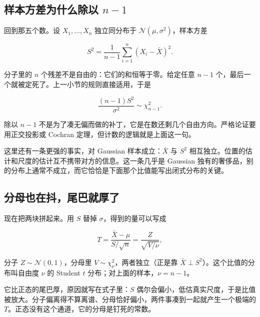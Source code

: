 \subsection{样本方差为什么除以 \texorpdfstring{\(n-1\)}{n-1}}

回到那五个数。设 \(X_1,\ldots,X_n\) 独立同分布于 \(\mathcal N(\mu,\sigma^2)\)，样本方差

\[
S^2=\frac1{n-1}\sum_{i=1}^n(X_i-\bar X)^2 .
\]

分子里的 \(n\) 个残差不是自由的：它们的和恒等于零。给定任意 \(n-1\) 个，最后一个就被定死了。上一小节的规则直接适用，于是

\[
\frac{(n-1)S^2}{\sigma^2}\sim\chi^2_{n-1}.
\]

除以 \(n-1\) 不是为了凑无偏而做的补丁，它是在数还剩几个自由方向。严格论证要用正交投影或 Cochran 定理，但计数的逻辑就是上面这一句。

这里还有一条更强的事实，对 Gaussian 样本成立：\(\bar X\) 与 \(S^2\) 相互独立。位置的估计和尺度的估计互不携带对方的信息。这一条几乎是 Gaussian 独有的奢侈品，别的分布上通常不成立，而它恰恰是下面那个比值能写出闭式分布的关键。

\subsection{分母也在抖，尾巴就厚了}

现在把两块拼起来。用 \(S\) 替掉 \(\sigma\)，得到的量可以写成

\[
T=\frac{\bar X-\mu}{S/\sqrt n}=\frac{Z}{\sqrt{V/\nu}},
\]

分子 \(Z\sim\mathcal N(0,1)\)，分母里 \(V\sim\chi^2_\nu\)，两者独立（正是靠 \(\bar X\perp S^2\)）。这个比值的分布叫自由度 \(\nu\) 的 Student \(t\) 分布；对上面的样本，\(\nu=n-1\)。

它比正态的尾巴厚，原因就写在式子里：\(S\) 偶尔会偏小，低估真实尺度，于是比值被放大。分子偏离得不算离谱、分母恰好偏小，两件事凑到一起就产生一个极端的 \(T\)。正态没有这个通道，它的分母是钉死的常数。

